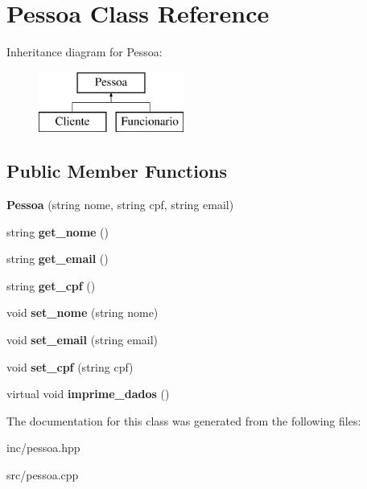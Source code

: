 \hypertarget{class_pessoa}{}\section{Pessoa Class Reference}
\label{class_pessoa}
Inheritance diagram for Pessoa\+:\begin{figure}[H]
\begin{center}
\leavevmode
\includegraphics[height=2.000000cm]{class_pessoa}
\end{center}
\end{figure}
\subsection*{Public Member Functions}
\begin{DoxyCompactItemize}
\item 
\mbox{\label{class_pessoa_a7bfba3ac538d37d02422346f61bb859d}} 
{\bfseries Pessoa} (string nome, string cpf, string email)
\item 
\mbox{\label{class_pessoa_a7fc758a1ba17e56d95dfbbc1e65cbedf}} 
string {\bfseries get\+\_\+nome} ()
\item 
\mbox{\label{class_pessoa_afc904106ca6695d07a382a0300f033ba}} 
string {\bfseries get\+\_\+email} ()
\item 
\mbox{\label{class_pessoa_a95123b811bca5c1d4c72233b29f227dd}} 
string {\bfseries get\+\_\+cpf} ()
\item 
\mbox{\label{class_pessoa_ade7bf4832051a8b35b2531632c986b7a}} 
void {\bfseries set\+\_\+nome} (string nome)
\item 
\mbox{\label{class_pessoa_a829da31a467d19d469925370301c34bd}} 
void {\bfseries set\+\_\+email} (string email)
\item 
\mbox{\label{class_pessoa_ae7fa0ed8427a1674ac87efd327aa2009}} 
void {\bfseries set\+\_\+cpf} (string cpf)
\item 
\mbox{\label{class_pessoa_aa7c97a8759a8813ac14033555dd32ae1}} 
virtual void {\bfseries imprime\+\_\+dados} ()
\end{DoxyCompactItemize}


The documentation for this class was generated from the following files\+:\begin{DoxyCompactItemize}
\item 
inc/pessoa.\+hpp\item 
src/pessoa.\+cpp\end{DoxyCompactItemize}
